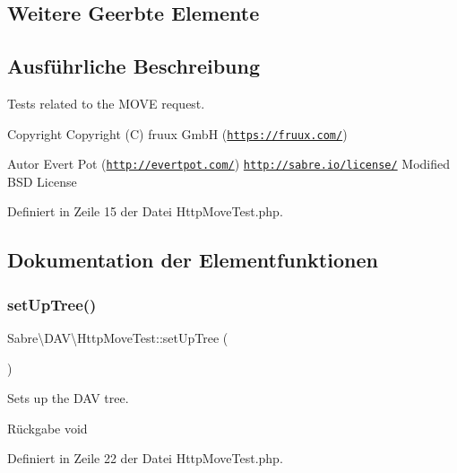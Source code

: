 \subsection*{Weitere Geerbte Elemente}


\subsection{Ausführliche Beschreibung}
Tests related to the M\+O\+VE request.

\begin{DoxyCopyright}{Copyright}
Copyright (C) fruux GmbH (\href{https://fruux.com/}{\tt https\+://fruux.\+com/}) 
\end{DoxyCopyright}
\begin{DoxyAuthor}{Autor}
Evert Pot (\href{http://evertpot.com/}{\tt http\+://evertpot.\+com/})  \href{http://sabre.io/license/}{\tt http\+://sabre.\+io/license/} Modified B\+SD License 
\end{DoxyAuthor}


Definiert in Zeile 15 der Datei Http\+Move\+Test.\+php.



\subsection{Dokumentation der Elementfunktionen}
\mbox{\label{class_sabre_1_1_d_a_v_1_1_http_move_test_aed2e57d9021d9d3e7d5cb3e5beb2c765}} 
\subsubsection{\texorpdfstring{set\+Up\+Tree()}{setUpTree()}}
{\footnotesize\ttfamily Sabre\textbackslash{}\+D\+A\+V\textbackslash{}\+Http\+Move\+Test\+::set\+Up\+Tree (\begin{DoxyParamCaption}{ }\end{DoxyParamCaption})}

Sets up the D\+AV tree.

\begin{DoxyReturn}{Rückgabe}
void 
\end{DoxyReturn}


Definiert in Zeile 22 der Datei Http\+Move\+Test.\+php.

